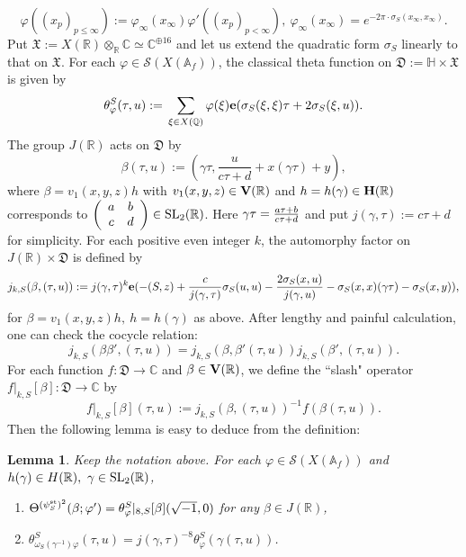 \documentclass[11pt]{amsart}
\numberwithin{equation}{section}
\newtheorem{lemma}[theorem]{Lemma}
\theoremstyle{definition}
\begin{document}
$$\varphi((x_p)_{p\le \infty}):=\varphi_\infty(x_\infty)\varphi'((x_p)_{p< \infty}),\ 
\varphi_\infty(x_\infty)=e^{-2\pi\cdot\sigma_S(x_\infty,x_\infty)}.
$$
Put $\mathfrak{X}:=X({\mathbb{R}})\otimes_{\mathbb{R}}{\mathbb{C}}\simeq {\mathbb{C}}^{\oplus 16}$ and let us extend the quadratic form $\sigma_S$ linearly to that on 
$\mathfrak{X}$. 
For each $\varphi \in \mathcal{S}(X({\mathbb{A}}_f))$, 
the classical theta function on $\mathfrak{D}:=\mathbb{H}\times \mathfrak{X}$ is given by 
$$\theta^S_\varphi(\tau,u):={\displaystyle}\sum_{\xi\in X({\mathbb{Q}})}\varphi(\xi)\bold{e}(\sigma_S(\xi,\xi)\tau+2\sigma_S(\xi,u)).$$
The group $J({\mathbb{R}})$ acts on $\mathfrak{D}$ by 
$$\beta(\tau,u):=\left(\gamma \tau,\frac{u}{c\tau+d}+x(\gamma \tau)+y \right),
$$
where $\beta=v_1(x,y,z)h$ with $v_1(x,y,z)\in \bold V({\mathbb{R}})$ and $h=h(\gamma)\in \bold H({\mathbb{R}})$ corresponds to 
$\left(\begin{array}{cc}
a & b \\
c & d
\end{array}\right)\in {\rm SL}_2({\mathbb{R}})$. 
Here $\gamma \tau={\displaystyle}\frac{a\tau+b}{c\tau+d}$ and put $j(\gamma,\tau):=c\tau+d$ for simplicity. 
For each positive even integer $k$, the automorphy factor on $J({\mathbb{R}})\times \mathfrak{D}$ is defined by 
$$j_{k,S}(\beta,(\tau,u)):=j(\gamma,\tau)^{k}
\bold{e}(-(S,z)+\frac{c}{j(\gamma,\tau)}\sigma_S(u,u)-\frac{2\sigma_S(x,u)}{j(\gamma,u)}-
\sigma_S(x,x)(\gamma\tau)-\sigma_S(x,y)),
$$
for $\beta=v_1(x,y,z)h,\ h=h(\gamma)$ as above. 
After lengthy and painful calculation, one can check the cocycle relation: 
$$j_{k,S}(\beta\beta',(\tau,u))=j_{k,S}(\beta,\beta'(\tau,u))j_{k,S}(\beta',(\tau,u)).$$
For each function $f:\mathfrak{D}{\longrightarrow} {\mathbb{C}}$ and $\beta\in \bold V({\mathbb{R}})$, 
we define the ``slash" operator $f|_{k,S}[\beta]:\mathfrak{D}{\longrightarrow} {\mathbb{C}}$ by 
$$f|_{k,S}[\beta](\tau,u):=j_{k,S}(\beta,(\tau,u))^{-1}f(\beta(\tau,u)).$$
Then the following lemma is easy to deduce from the definition:

\begin{lemma}\label{adelic-to-classical} Keep the notation above. 
For each $\varphi \in \mathcal{S}(X({\mathbb{A}}_f))$ and $h(\gamma)\in H({\mathbb{R}}),\ \gamma\in {\rm SL}_2({\mathbb{R}})$, 

\begin{enumerate}
\item $\Theta^{(\psi^{{\rm st}}_S)^2}(\beta;\varphi')=\theta^S_\varphi|_{8,S}[\beta](\sqrt{-1},0)$ 
for any $\beta \in J({\mathbb{R}})$, 

\item $\theta^S_{\omega_S(\gamma^{-1})\varphi}(\tau,u)=j(\gamma,\tau)^{-8}\theta^S_\varphi(\gamma(\tau,u))$. 
\end{enumerate}
\end{lemma}
\end{document}
